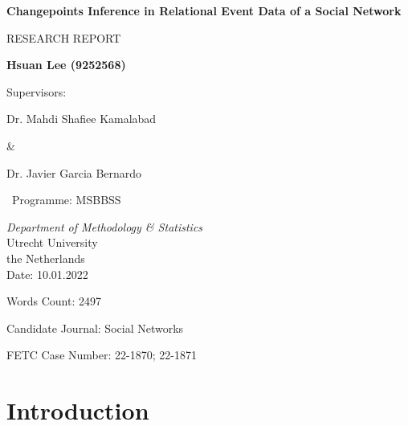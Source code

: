 \documentclass[]{interact}
\theoremstyle{plain}%
\theoremstyle{definition}
\theoremstyle{remark}
\begin{document}
\begin{titlepage}
    \begin{center}
        \vspace*{1cm}
            
        \Huge
        \textbf{Changepoints Inference in Relational Event Data of a Social Network}
            
        \vspace{0.8cm}
        \LARGE
        RESEARCH REPORT
            
        \vspace{2cm}
            
        \textbf{Hsuan Lee (9252568)}
        
        \vspace{1cm}
        Supervisors: 
        
        \vspace{0.5cm}
        
        Dr. Mahdi Shafiee Kamalabad 
        
        \& 
        
        Dr. Javier Garcia Bernardo
        
        \vspace{2cm}
        \Large
        
        \ Programme: MSBBSS
        
        \vspace{0.3cm}
        
        \emph{Department of Methodology \& Statistics}\\
        
        \vspace{0.3cm}
        Utrecht University\\
        the Netherlands\\
        
        \vspace{1.5cm}    
        \Large
        Date: 10.01.2022
        
        Words Count: 2497
        
        Candidate Journal: Social Networks
        
        FETC Case Number: 22-1870; 22-1871
        
    \end{center}
\end{titlepage}


\section{\fontsize{14}{15}\selectfont Introduction}
\end{document}
